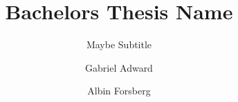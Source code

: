 \documentclass[fleqn, 12pt]{scrreprt}
\title{Bachelors Thesis Name}
\subtitle{Maybe Subtitle}
\author{Gabriel Adward \and Albin Forsberg}
\begin{document}
\maketitle

\begin{abstract}
\end{abstract}

\tableofcontents








\end{document}
